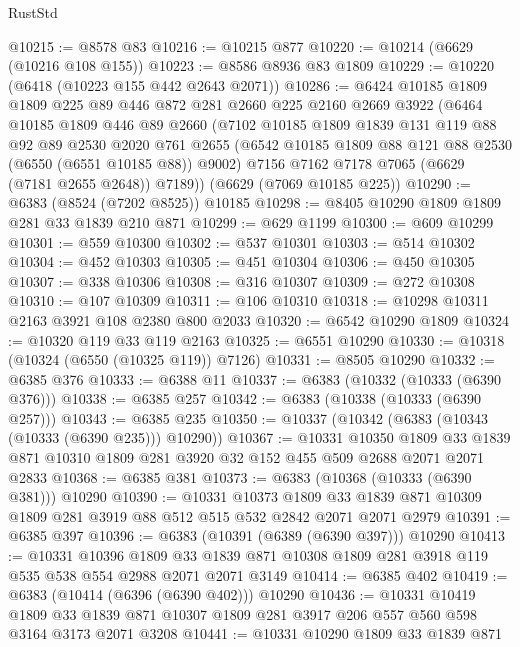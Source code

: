 \begin{lexlean}{RustStd}
\begin{coremodule}
@10215 := @8578 @83
@10216 := @10215 @877
@10220 := @10214 (@6629 (@10216 @108 @155))
@10223 := @8586 @8936 @83 @1809
@10229 := @10220 (@6418 (@10223 @155 @442 @2643 @2071))
@10286 := @6424
    @10185
    @1809
    @1809
    @225
    @89
    @446
    @872
    @281
    @2660
    @225
    @2160
    @2669
    @3922
    (@6464
      @10185
      @1809
      @446
      @89
      @2660
      (@7102
        @10185
        @1809
        @1839
        @131
        @119
        @88
        @92
        @89
        @2530
        @2020
        @761
        @2655
        (@6542 @10185 @1809 @88 @121 @88 @2530 (@6550 (@6551 @10185 @88)) @9002)
        @7156
        @7162
        @7178
        @7065
        (@6629 (@7181 @2655 @2648))
        @7189))
    (@6629 (@7069 @10185 @225))
@10290 := @6383 (@8524 (@7202 @8525)) @10185
@10298 := @8405 @10290 @1809 @1809 @281 @33 @1839 @210 @871
@10299 := @629 @1199
@10300 := @609 @10299
@10301 := @559 @10300
@10302 := @537 @10301
@10303 := @514 @10302
@10304 := @452 @10303
@10305 := @451 @10304
@10306 := @450 @10305
@10307 := @338 @10306
@10308 := @316 @10307
@10309 := @272 @10308
@10310 := @107 @10309
@10311 := @106 @10310
@10318 := @10298 @10311 @2163 @3921 @108 @2380 @800 @2033
@10320 := @6542 @10290 @1809
@10324 := @10320 @119 @33 @119 @2163
@10325 := @6551 @10290
@10330 := @10318 (@10324 (@6550 (@10325 @119)) @7126)
@10331 := @8505 @10290
@10332 := @6385 @376
@10333 := @6388 @11
@10337 := @6383 (@10332 (@10333 (@6390 @376)))
@10338 := @6385 @257
@10342 := @6383 (@10338 (@10333 (@6390 @257)))
@10343 := @6385 @235
@10350 := @10337 (@10342 (@6383 (@10343 (@10333 (@6390 @235))) @10290))
@10367 := @10331
    @10350
    @1809
    @33
    @1839
    @871
    @10310
    @1809
    @281
    @3920
    @32
    @152
    @455
    @509
    @2688
    @2071
    @2071
    @2833
@10368 := @6385 @381
@10373 := @6383 (@10368 (@10333 (@6390 @381))) @10290
@10390 := @10331
    @10373
    @1809
    @33
    @1839
    @871
    @10309
    @1809
    @281
    @3919
    @88
    @512
    @515
    @532
    @2842
    @2071
    @2071
    @2979
@10391 := @6385 @397
@10396 := @6383 (@10391 (@6389 (@6390 @397))) @10290
@10413 := @10331
    @10396
    @1809
    @33
    @1839
    @871
    @10308
    @1809
    @281
    @3918
    @119
    @535
    @538
    @554
    @2988
    @2071
    @2071
    @3149
@10414 := @6385 @402
@10419 := @6383 (@10414 (@6396 (@6390 @402))) @10290
@10436 := @10331
    @10419
    @1809
    @33
    @1839
    @871
    @10307
    @1809
    @281
    @3917
    @206
    @557
    @560
    @598
    @3164
    @3173
    @2071
    @3208
@10441 := @10331 @10290 @1809 @33 @1839 @871

\end{coremodule}
\end{lexlean}
